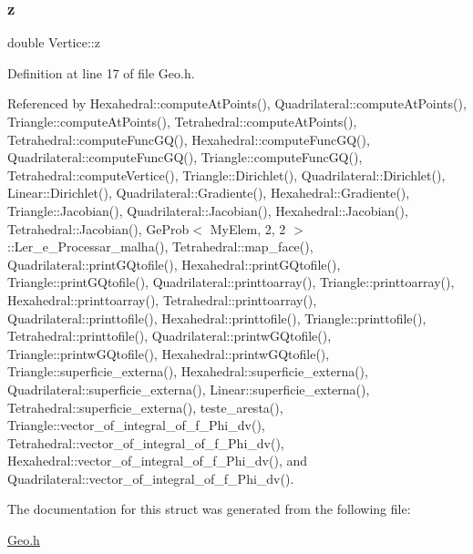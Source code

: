 \mbox{\label{structVertice_a9c3a0bca48a0ec755b342fa37ac6737e}} 
\subsubsection{\texorpdfstring{z}{z}}
{\footnotesize\ttfamily double Vertice\+::z}



Definition at line 17 of file Geo.\+h.



Referenced by Hexahedral\+::compute\+At\+Points(), Quadrilateral\+::compute\+At\+Points(), Triangle\+::compute\+At\+Points(), Tetrahedral\+::compute\+At\+Points(), Tetrahedral\+::compute\+Func\+G\+Q(), Hexahedral\+::compute\+Func\+G\+Q(), Quadrilateral\+::compute\+Func\+G\+Q(), Triangle\+::compute\+Func\+G\+Q(), Tetrahedral\+::compute\+Vertice(), Triangle\+::\+Dirichlet(), Quadrilateral\+::\+Dirichlet(), Linear\+::\+Dirichlet(), Quadrilateral\+::\+Gradiente(), Hexahedral\+::\+Gradiente(), Triangle\+::\+Jacobian(), Quadrilateral\+::\+Jacobian(), Hexahedral\+::\+Jacobian(), Tetrahedral\+::\+Jacobian(), Ge\+Prob$<$ My\+Elem, 2, 2 $>$\+::\+Ler\+\_\+e\+\_\+\+Processar\+\_\+malha(), Tetrahedral\+::map\+\_\+face(), Quadrilateral\+::print\+G\+Qtofile(), Hexahedral\+::print\+G\+Qtofile(), Triangle\+::print\+G\+Qtofile(), Quadrilateral\+::printtoarray(), Triangle\+::printtoarray(), Hexahedral\+::printtoarray(), Tetrahedral\+::printtoarray(), Quadrilateral\+::printtofile(), Hexahedral\+::printtofile(), Triangle\+::printtofile(), Tetrahedral\+::printtofile(), Quadrilateral\+::printw\+G\+Qtofile(), Triangle\+::printw\+G\+Qtofile(), Hexahedral\+::printw\+G\+Qtofile(), Triangle\+::superficie\+\_\+externa(), Hexahedral\+::superficie\+\_\+externa(), Quadrilateral\+::superficie\+\_\+externa(), Linear\+::superficie\+\_\+externa(), Tetrahedral\+::superficie\+\_\+externa(), teste\+\_\+aresta(), Triangle\+::vector\+\_\+of\+\_\+integral\+\_\+of\+\_\+f\+\_\+\+Phi\+\_\+dv(), Tetrahedral\+::vector\+\_\+of\+\_\+integral\+\_\+of\+\_\+f\+\_\+\+Phi\+\_\+dv(), Hexahedral\+::vector\+\_\+of\+\_\+integral\+\_\+of\+\_\+f\+\_\+\+Phi\+\_\+dv(), and Quadrilateral\+::vector\+\_\+of\+\_\+integral\+\_\+of\+\_\+f\+\_\+\+Phi\+\_\+dv().



The documentation for this struct was generated from the following file\+:\begin{DoxyCompactItemize}
\item 
\hyperlink{Geo_8h}{Geo.\+h}\end{DoxyCompactItemize}
